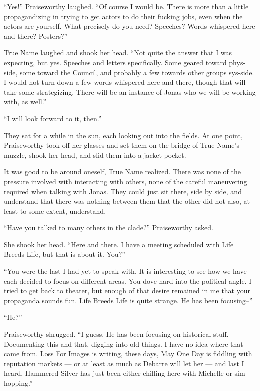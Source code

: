 ``Yes!'' Praiseworthy laughed. ``Of course I would be. There is more than a little propagandizing in trying to get actors to do their fucking jobs, even when the actors are yourself. What precisely do you need? Speeches? Words whispered here and there? Posters?''

True Name laughed and shook her head. ``Not quite the answer that I was expecting, but yes. Speeches and letters specifically. Some geared toward phys-side, some toward the Council, and probably a few towards other groups sys-side. I would not turn down a few words whispered here and there, though that will take some strategizing. There will be an instance of Jonas who we will be working with, as well.''

``I will look forward to it, then.''

They sat for a while in the sun, each looking out into the fields. At one point, Praiseworthy took off her glasses and set them on the bridge of True Name's muzzle, shook her head, and slid them into a jacket pocket.

It was good to be around oneself, True Name realized. There was none of the pressure involved with interacting with others, none of the careful maneuvering required when talking with Jonas. They could just sit there, side by side, and understand that there was nothing between them that the other did not also, at least to some extent, understand.

``Have you talked to many others in the clade?'' Praiseworthy asked.

She shook her head. ``Here and there. I have a meeting scheduled with Life Breeds Life, but that is about it. You?''

``You were the last I had yet to speak with. It is interesting to see how we have each decided to focus on different areas. You dove hard into the political angle. I tried to get back to theater, but enough of that desire remained in me that your propaganda sounds fun. Life Breeds Life is quite strange. He has been focusing--''

``He?''

Praiseworthy shrugged. ``I guess. He has been focusing on historical stuff. Documenting this and that, digging into old things. I have no idea where that came from. Loss For Images is writing, these days, May One Day is fiddling with reputation markets — or at least as much as Debarre will let her — and last I heard, Hammered Silver has just been either chilling here with Michelle or sim-hopping.''

